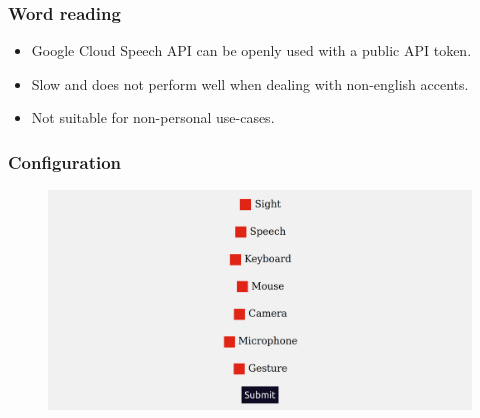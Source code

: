\documentclass{beamer}
\begin{document}
\begin{frame}
	\frametitle{Word reading}

	\begin{itemize}
		\item <2-> Google Cloud Speech API can be openly used with a public API token.
		\item <2-> Slow and does not perform well when dealing with non-english accents.
		\item <2-> Not suitable for non-personal use-cases.
	\end{itemize}


\end{frame}

\begin{frame}
	\frametitle{Configuration}
	\begin{figure}[h!t]
		\centering
		\includegraphics[scale=0.15]{assets/images/configure.png}
	\end{figure}

\end{frame}

\begin{frame}
\end{frame}
\end{document}
